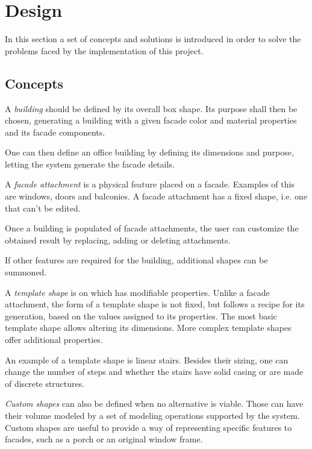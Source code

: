 \chapter{Design}

In this section a set of concepts and solutions is introduced in order to solve the problems faced
by the implementation of this project.




\section{Concepts}

A \emph{building} should be defined by its overall box shape.
Its purpose shall then be chosen, generating a building
with a given facade color and material properties and
its facade components.

One can then define an office building by defining its dimensions
and purpose, letting the system generate the facade details.


A \emph{facade attachment} is a physical feature placed on a facade.
Examples of this are windows, doors and balconies.
A facade attachment has a fixed shape, i.e. one that can't be edited.

Once a building is populated of facade attachments,
the user can customize the obtained result
by replacing, adding or deleting attachments.

If other features are required for the building,
additional shapes can be summoned.

A \emph{template shape} is on which has modifiable properties.
Unlike a facade attachment, the form of a template shape
is not fixed, but follows a recipe for its generation, based
on the values assigned to its properties.
The most basic template shape allows altering its dimensions.
More complex template shapes offer additional properties.

An example of a template shape is linear stairs.
Besides their sizing, one can change the number of steps and
whether the stairs have solid casing or are made of discrete structures.


\emph{Custom shapes} can also be defined when no alternative is viable.
Those can have their volume modeled by a set of modeling operations
supported by the system.
Custom shapes are useful to provide a way of representing
specific features to facades, such as a porch or an original window frame.


